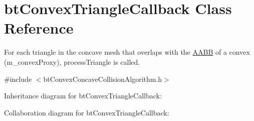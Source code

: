 \hypertarget{classbt_convex_triangle_callback}{\section{bt\+Convex\+Triangle\+Callback Class Reference}
\label{classbt_convex_triangle_callback}
}


For each triangle in the concave mesh that overlaps with the \hyperlink{class_a_a_b_b}{A\+A\+B\+B} of a convex (m\+\_\+convex\+Proxy), process\+Triangle is called.  




{\ttfamily \#include $<$bt\+Convex\+Concave\+Collision\+Algorithm.\+h$>$}



Inheritance diagram for bt\+Convex\+Triangle\+Callback\+:


Collaboration diagram for bt\+Convex\+Triangle\+Callback\+:
